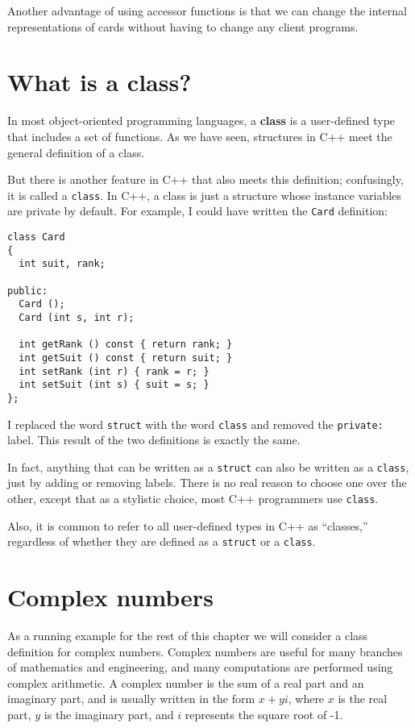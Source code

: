 Another advantage of using accessor functions is that we
can change the internal representations of cards without
having to change any client programs.

\section{What is a class?}

In most object-oriented programming languages, a {\bf class} is
a user-defined type that includes a set of functions.  As
we have seen, structures in C++ meet the general definition of
a class.

But there is another feature in C++ that also meets this definition;
confusingly, it is called a {\tt class}.  In C++, a class
is just a structure whose instance variables are private by
default.  For example, I could have written the {\tt Card}
definition:

\begin{lstlisting}
class Card
{
  int suit, rank;

public:
  Card ();
  Card (int s, int r);

  int getRank () const { return rank; }
  int getSuit () const { return suit; }
  int setRank (int r) { rank = r; }
  int setSuit (int s) { suit = s; }
};
\end{lstlisting}
%
I replaced the word {\tt struct} with the word {\tt class} and
removed the {\tt private:} label.  This result of the two definitions
is exactly the same.


In fact, anything that can be written as a {\tt struct} can also
be written as a {\tt class}, just by adding or removing labels.
There is no real reason to choose one over the other, except that
as a stylistic choice, most C++ programmers use {\tt class}.

Also, it is common to refer to all user-defined types in C++ as
``classes,'' regardless of whether they are defined as a {\tt struct}
or a {\tt class}.

\section{Complex numbers}

As a running example for the rest of this chapter we will consider a
class definition for complex numbers.  Complex numbers are useful for
many branches of mathematics and engineering, and many computations
are performed using complex arithmetic.  A complex number is the sum
of a real part and an imaginary part, and is usually written in the
form $x + yi$, where $x$ is the real part, $y$ is the imaginary part,
and $i$ represents the square root of -1.

